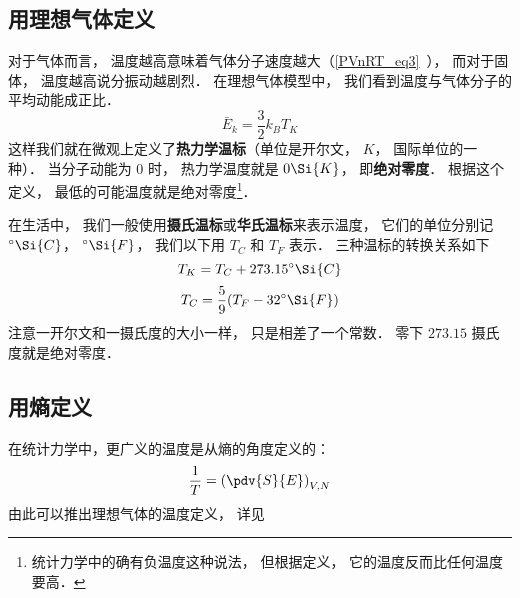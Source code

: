 

\subsection{用理想气体定义}
对于气体而言， 温度越高意味着气体分子速度越大（\autoref{PVnRT_eq3}~）， 而对于固体， 温度越高说分振动越剧烈． 在理想气体模型中， 我们看到温度与气体分子的平均动能成正比． 
\begin{equation}
\bar E_k = \frac{3}{2} k_B T_K
\end{equation}
这样我们就在微观上定义了\textbf{热力学温标}（单位是开尔文， $K$， 国际单位的一种）． 当分子动能为 0 时， 热力学温度就是 $0 \Si{K}$， 即\textbf{绝对零度}． 根据这个定义， 最低的可能温度就是绝对零度\footnote{统计力学中的确有负温度这种说法， 但根据定义， 它的温度反而比任何温度要高．}．

在生活中， 我们一般使用\textbf{摄氏温标}或\textbf{华氏温标}来表示温度， 它们的单位分别记 $^\circ\Si{C}$， $^\circ\Si{F}$， 我们以下用 $T_C$ 和 $T_F$ 表示． 三种温标的转换关系如下
\begin{equation}
T_K = T_C + 273.15^\circ\Si{C}
\end{equation}
\begin{equation}
T_C = \frac{5}{9}(T_F - 32^\circ\Si{F})
\end{equation}
注意一开尔文和一摄氏度的大小一样， 只是相差了一个常数． 零下 $273.15$ 摄氏度就是绝对零度．

\subsection{用熵定义}
在统计力学中，更广义的温度是从熵的角度定义的：
\begin{equation}
\frac{1}{T} = \left(\pdv{S}{E}\right)_{V,N} 
\end{equation}
由此可以推出理想气体的温度定义， 详见
